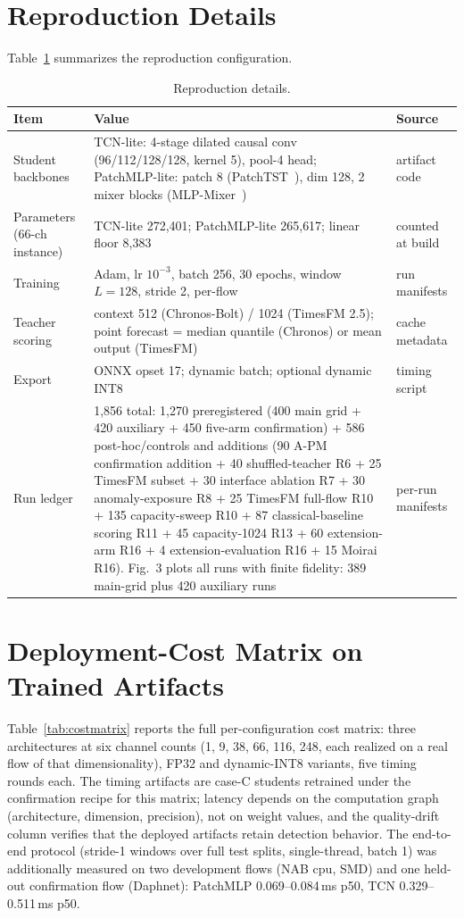 \documentclass[pdflatex,sn-basic,Numbered]{sn-jnl}
\begin{document}
\section{Reproduction Details}\label{app:repro}
Table~\ref{tab:repro} summarizes the reproduction configuration.
\begin{table}[t]
\centering
\scriptsize
\caption{Reproduction details.}\label{tab:repro}
\begin{tabular}{p{3.7cm}p{3.5cm}p{3.5cm}}
\toprule
Item & Value & Source \\
\midrule
Student backbones & TCN-lite: 4-stage dilated causal conv (96/112/128/128, kernel 5), pool-4 head; PatchMLP-lite: patch 8 (PatchTST~\cite{nie2023patchtst}), dim 128, 2 mixer blocks (MLP-Mixer~\cite{tolstikhin2021mixer}) & artifact code \\
Parameters (66-ch instance) & TCN-lite 272{,}401; PatchMLP-lite 265{,}617; linear floor 8{,}383 & counted at build \\
Training & Adam, lr $10^{-3}$, batch 256, 30 epochs, window $L{=}128$, stride 2, per-flow & run manifests \\
Teacher scoring & context 512 (Chronos-Bolt) / 1024 (TimesFM 2.5); point forecast = median quantile (Chronos) or mean output (TimesFM) & cache metadata \\
Export & ONNX opset 17; dynamic batch; optional dynamic INT8 & timing script \\
Run ledger & 1{,}856 total: 1{,}270 preregistered (400 main grid + 420 auxiliary + 450 five-arm confirmation) + 586 post-hoc/controls and additions (90 A-PM confirmation addition + 40 shuffled-teacher R6 + 25 TimesFM subset + 30 interface ablation R7 + 30 anomaly-exposure R8 + 25 TimesFM full-flow R10 + 135 capacity-sweep R10 + 87 classical-baseline scoring R11 + 45 capacity-1024 R13 + 60 extension-arm R16 + 4 extension-evaluation R16 + 15 Moirai R16). Fig.~3 plots all runs with finite fidelity: 389 main-grid plus 420 auxiliary runs & per-run manifests \\
\bottomrule
\end{tabular}
\end{table}

\section{Deployment-Cost Matrix on Trained Artifacts}\label{app:cost}
Table~\ref{tab:costmatrix} reports the full per-configuration cost
matrix: three architectures at six channel counts (1, 9, 38, 66, 116,
248, each realized on a real flow of that dimensionality), FP32 and
dynamic-INT8 variants, five timing rounds each. The timing artifacts
are case-C students retrained under the confirmation recipe for this
matrix; latency depends on the computation graph (architecture,
dimension, precision), not on weight values, and the quality-drift
column verifies that the deployed artifacts retain detection behavior.
The end-to-end protocol (stride-1 windows over full test splits,
single-thread, batch 1) was additionally measured on two development
flows (NAB cpu, SMD) and one held-out confirmation flow (Daphnet):
PatchMLP 0.069--0.084\,ms p50, TCN 0.329--0.511\,ms p50.




\end{document}
